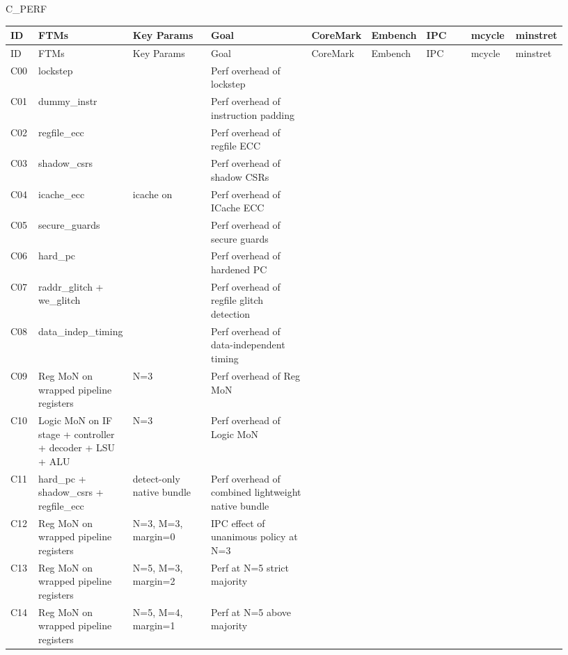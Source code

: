 C\_PERF

\begin{longtable}{|p{0.05\linewidth}|p{0.16\linewidth}|p{0.14\linewidth}|p{0.18\linewidth}|p{0.08\linewidth}|p{0.08\linewidth}|p{0.08\linewidth}|p{0.08\linewidth}|p{0.08\linewidth}|}
\hline
ID & FTMs & Key Params & Goal & CoreMark & Embench & IPC & mcycle & minstret \\
\hline
\endfirsthead
\hline
ID & FTMs & Key Params & Goal & CoreMark & Embench & IPC & mcycle & minstret \\
\hline
\endhead
C00 & lockstep &  & Perf overhead of lockstep &  &  &  &  &  \\
\hline
C01 & dummy\_instr &  & Perf overhead of instruction padding &  &  &  &  &  \\
\hline
C02 & regfile\_ecc &  & Perf overhead of regfile ECC &  &  &  &  &  \\
\hline
C03 & shadow\_csrs &  & Perf overhead of shadow CSRs &  &  &  &  &  \\
\hline
C04 & icache\_ecc & icache on & Perf overhead of ICache ECC &  &  &  &  &  \\
\hline
C05 & secure\_guards &  & Perf overhead of secure guards &  &  &  &  &  \\
\hline
C06 & hard\_pc &  & Perf overhead of hardened PC &  &  &  &  &  \\
\hline
C07 & raddr\_glitch + we\_glitch &  & Perf overhead of regfile glitch detection &  &  &  &  &  \\
\hline
C08 & data\_indep\_timing &  & Perf overhead of data-independent timing &  &  &  &  &  \\
\hline
C09 & Reg MoN on wrapped pipeline registers & N=3 & Perf overhead of Reg MoN &  &  &  &  &  \\
\hline
C10 & Logic MoN on IF stage + controller + decoder + LSU + ALU & N=3 & Perf overhead of Logic MoN &  &  &  &  &  \\
\hline
C11 & hard\_pc + shadow\_csrs + regfile\_ecc & detect-only native bundle & Perf overhead of combined lightweight native bundle &  &  &  &  &  \\
\hline
C12 & Reg MoN on wrapped pipeline registers & N=3, M=3, margin=0 & IPC effect of unanimous policy at N=3 &  &  &  &  &  \\
\hline
C13 & Reg MoN on wrapped pipeline registers & N=5, M=3, margin=2 & Perf at N=5 strict majority &  &  &  &  &  \\
\hline
C14 & Reg MoN on wrapped pipeline registers & N=5, M=4, margin=1 & Perf at N=5 above majority &  &  &  &  &  \\

\end{longtable}
